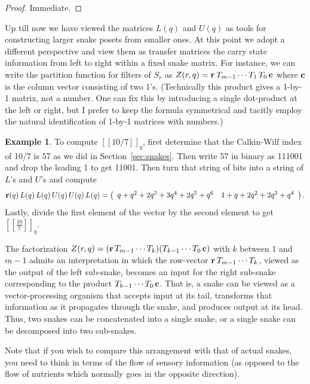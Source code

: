 \documentclass[12pt]{article}
\theoremstyle{plain}
\theoremstyle{definition}
\newtheorem{example}[theorem]{Example}
\theoremstyle{remark}
\newcommand{\llb}{[\![}
\newcommand{\rrb}{]\!]}
\begin{document}
\begin{proof}
Immediate.
\end{proof}

Up till now we have viewed the matrices $L(q)$ and $U(q)$ 
as tools for constructing larger snake posets from smaller ones.
At this point we adopt a different perspective
and view them as transfer matrices
the carry state information from left to right within a fixed snake matrix.
For instance, we can write the partition function for filters of $S_r$ as
$Z(r,q) = {\bf r} \: T_{m-1} \cdots T_1 \, T_0 \, {\bf c}$
where ${\bf c}$ is the column vector consisting of two 1's.
(Technically this product gives a 1-by-1 matrix, not a number.
One can fix this by introducing a single dot-product at the left or right,
but I prefer to keep the formula symmetrical and tacitly employ 
the natural identification of 1-by-1 matrices with numbers.)

\begin{example}
To compute $\llb 10/7 \rrb_q$, first determine
that the Calkin-Wilf index of 10/7 is 57
as we did in Section~\ref{sec:snakes}. 
Then write 57 in binary as 111001
and drop the leading 1 to get 11001.
Then turn that string of bits into a string of $L$'s and $U$'s
and compute $${\bf r}(q) \, L (q) \, L (q) \, U (q) \, U (q) \, L (q) = 
\left( \begin{array}{cc} q+q^2+2q^3+3q^4+2q^5+q^6 & 1+q+2q^2+2q^3+q^4 
\end{array} \right).$$ 
Lastly, divide the first element of the vector by the second element
to get $\llb \frac{10}{7} \rrb_q$.
\label{ex:tsq}
\end{example}

The factorization
$Z(r,q) = ({\bf r} \, T_{m-1} \cdots T_{k}) (T_{k-1} \cdots T_0 \, {\bf c})$
with $k$ between 1 and $m-1$ admits an interpretation
in which the row-vector ${\bf r} \: T_{m-1} \cdots T_{k}$,
viewed as the output of the left sub-snake,
becomes an input for the right sub-snake corresponding to
the product $T_{k-1} \cdots T_0 \, {\bf c}$.
That is, a snake can be viewed as a vector-processing organism 
that accepts input at its tail, 
transforms that information as it propagates through the snake, 
and produces output at its head.
Thus, two snakes can be concatenated into a single snake, 
or a single snake can be decomposed into two sub-snakes.

Note that if you wish to compare this arrangement with that of actual snakes,
you need to think in terms of the flow of sensory information (as opposed to 
the flow of nutrients which normally goes in the opposite direction).
\end{document}
